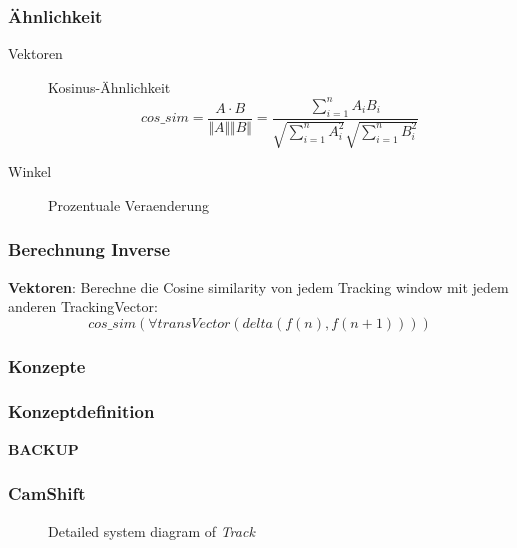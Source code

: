 \documentclass{beamer}
\begin{document}
\begin{frame}
\frametitle{Ähnlichkeit}
\begin{description}
    \item[Vektoren] Kosinus-Ähnlichkeit
    \[cos\_sim = \frac{A \cdot B}{\Vert A\Vert \Vert B\Vert} = \frac{\sum\limits_{i=1}^{n} A_iB_i}{\sqrt{\sum\limits_{i=1}^{n}A_i^2} \sqrt{\sum\limits_{i=1}^{n}B_i^2}}\]
    \item[Winkel] Prozentuale Veraenderung
\end{description}
\end{frame}

\begin{frame}
\frametitle{Berechnung Inverse}
    \textbf{Vektoren}:
        Berechne die Cosine similarity von jedem Tracking window mit jedem anderen TrackingVector:
        \[cos\_sim(\forall transVector(delta(f(n), f(n+1))) )\]
\end{frame}

\begin{frame}
\frametitle{Konzepte}
\end{frame}

\begin{frame}
\frametitle{Konzeptdefinition}
\end{frame}


\begin{frame}
\begin{center}
    \textbf{\huge BACKUP}
\end{center}
\end{frame}

\begin{frame}
    \frametitle{CamShift}
    \begin{figure}[h!]
        \resizebox{\textwidth}{!}{%
        }
        \caption{Detailed system diagram of \textit{Track}}
    \end{figure}
\end{frame}
\end{document}
